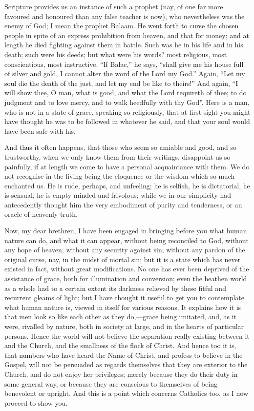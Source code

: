 Scripture provides us an instance of such a prophet (nay, of one
far more favoured and honoured than any false teacher is now), who
nevertheless was the enemy of God; I mean the prophet Balaam. He went
forth to curse the chosen people in spite of an express prohibition
from heaven, and that for money; and at length he died fighting
against them in battle. Such was he in his life and in his death; such
were his deeds; but what were his words? most religious, most
conscientious, most instructive. ``If Balac,'' he says,
``shall give me his house full of silver and gold, I cannot alter
the word of the Lord my God.'' Again, ``Let my soul die the
death of the just, and let my end be like to theirs!'' And again,
``I will show thee, O man, what is good, and what the Lord
requireth of thee; to do judgment and to love mercy, and to walk
heedfully with thy God''. Here is a man, who is not in a state of
grace, speaking so religiously, that at first sight you might have
thought he was to be followed in whatever he said, and that your soul
would have been safe with his.

And thus it often happens, that those who seem so amiable and good,
and so trustworthy, when we only know them from their writings,
disappoint us so painfully, if at length we come to have a personal
acquaintance with them. We do not recognise in the living being the
eloquence or the wisdom which so much enchanted us. He is rude,
perhaps, and unfeeling; he is selfish, he is dictatorial, he is
sensual, he is empty-minded and frivolous; while we in our simplicity
had antecedently thought him the very embodiment of purity and
tenderness, or an oracle of heavenly truth.

Now, my dear brethren, I have been engaged in bringing before you
what human nature can do, and what it can appear, without being
reconciled to God, without any hope of heaven, without any security
against sin, without any pardon of the original curse, nay, in the
midst of mortal sin; but it is a state which has never existed in
fact, without great modifications. No one has ever been deprived of
the assistance of grace, both for illumination and conversion; even
the heathen world as a whole had to a certain extent its darkness
relieved by these fitful and recurrent gleams of light; but I have
thought it useful to get you to contemplate what human nature is,
viewed in itself for various reasons. It explains how it is that men
look so like each other as they do,—grace being imitated, and, as it
were, rivalled by nature, both in society at large, and in the hearts
of particular persons. Hence the world will not believe the separation
really existing between it and the Church, and the smallness of the
flock of Christ. And hence too it is, that numbers who have heard the
Name of Christ, and profess to believe in the Gospel, will not be
persuaded as regards themselves that they are exterior to the Church,
and do not enjoy her privileges; merely because they do their duty in
some general way, or because they are conscious to themselves of being
benevolent or upright. And this is a point which concerns Catholics
too, as I now proceed to show you.

